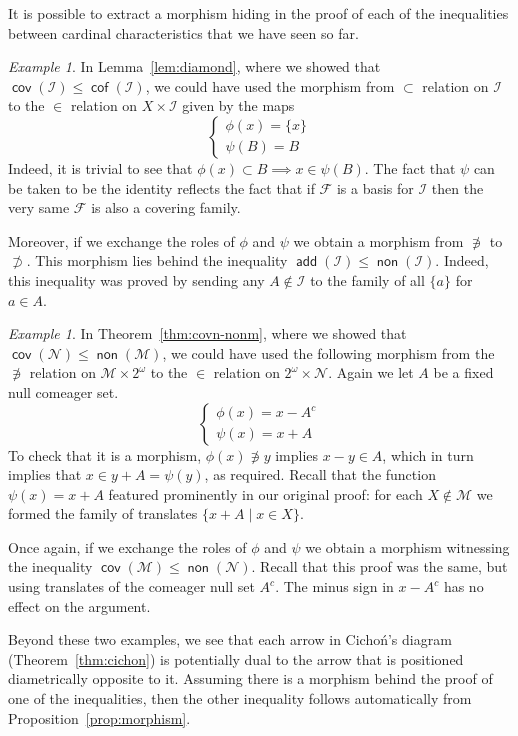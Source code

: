 \documentclass[11pt,oneside]{amsbook}
\newcommand{\Null}{\mathcal N}
\newcommand{\Meager}{\mathcal M}
\DeclareMathOperator{\add}{\mathsf{add}}
\DeclareMathOperator{\non}{\mathsf{non}}
\DeclareMathOperator{\cov}{\mathsf{cov}}
\DeclareMathOperator{\cof}{\mathsf{cof}}
\theoremstyle{definition}
\theoremstyle{plain}
\theoremstyle{definition}
\theoremstyle{remark}
\newtheorem{example}[theorem]{Example}
\numberwithin{equation}{section}
\numberwithin{figure}{section}
\begin{document}
It is possible to extract a morphism hiding in the proof of each of the inequalities between cardinal characteristics that we have seen so far.

\begin{example}
  In Lemma~\ref{lem:diamond}, where we showed that $\cov(\mathcal I)\leq\cof(\mathcal I)$, we could have used the morphism from $\subset$ relation on $\mathcal I$ to the $\in$ relation on $X\times\mathcal I$ given by the maps
  \[\begin{cases}\phi(x)=\{x\}\\\psi(B)=B\end{cases}
  \]
  Indeed, it is trivial to see that $\phi(x)\subset B\implies x\in\psi(B)$. The fact that $\psi$ can be taken to be the identity reflects the fact that if $\mathcal F$ is a basis for $\mathcal I$ then the very same $\mathcal F$ is also a covering family.

  Moreover, if we exchange the roles of $\phi$ and $\psi$ we obtain a morphism from $\not\ni$ to $\not\supset$. This morphism lies behind the inequality $\add(\mathcal I)\leq\non(\mathcal I)$. Indeed, this inequality was proved by sending any $A\notin\mathcal I$ to the family of all $\{a\}$ for $a\in A$.
\end{example}

\begin{example}
  In Theorem~\ref{thm:covn-nonm}, where we showed that $\cov(\Null)\leq\non(\Meager)$, we could have used the following morphism from the $\not\ni$ relation on $\Meager\times2^\omega$ to the $\in$ relation on $2^\omega\times\Null$. Again we let $A$ be a fixed null comeager set.
  \[\begin{cases}\phi(x)=x-A^c\\\psi(x)=x+A\end{cases}
  \]
  To check that it is a morphism, $\phi(x)\not\ni y$ implies $x-y\in A$, which in turn implies that $x\in y+A=\psi(y)$, as required. Recall that the function $\psi(x)=x+A$ featured prominently in our original proof: for each $X\notin\Meager$ we formed the family of translates $\{x+A\mid x\in X\}$.
  
  Once again, if we exchange the roles of $\phi$ and $\psi$ we obtain a morphism witnessing the inequality $\cov(\Meager)\leq\non(\Null)$. Recall that this proof was the same, but using translates of the comeager null set $A^c$. The minus sign in $x-A^c$ has no effect on the argument.
\end{example}

Beyond these two examples, we see that each arrow in Cicho\'n's diagram (Theorem~\ref{thm:cichon}) is potentially dual to the arrow that is positioned diametrically opposite to it. Assuming there is a morphism behind the proof of one of the inequalities, then the other inequality follows automatically from Proposition~\ref{prop:morphism}.
\end{document}

